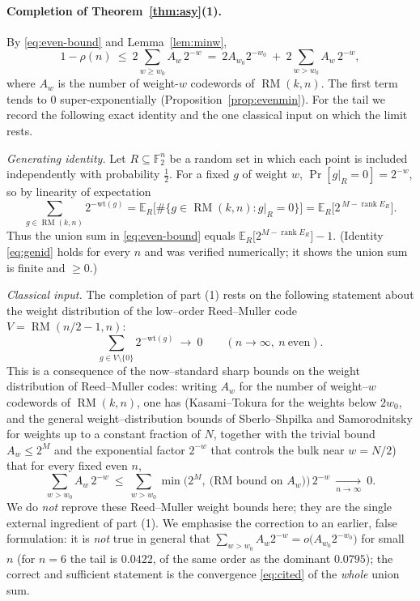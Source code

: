 \documentclass{amsart}
\theoremstyle{definition}
\DeclareMathOperator{\RM}{RM}
\DeclareMathOperator{\rank}{rank}
\newcommand{\F}{\mathbb{F}}
\begin{document}
\paragraph{Completion of Theorem~\ref{thm:asy}(1).}
By \eqref{eq:even-bound} and Lemma~\ref{lem:minw},
\begin{equation}\label{eq:tailsplit}
1-\rho(n)\ \le\ 2\sum_{w\ge w_0}A_w\,2^{-w}
\ =\ 2A_{w_0}2^{-w_0}\ +\ 2\sum_{w>w_0}A_w\,2^{-w},
\end{equation}
where $A_w$ is the number of weight-$w$ codewords of $\RM(k,n)$. The first
term tends to $0$ super-exponentially (Proposition~\ref{prop:evenmin}). For
the tail we record the following exact identity and the one classical input
on which the limit rests.

\emph{Generating identity.} Let $R\subseteq\F_2^n$ be a random set in which
each point is included independently with probability $\tfrac12$. For a
fixed $g$ of weight $w$, $\Pr[g|_R=0]=2^{-w}$, so by linearity of
expectation
\begin{equation}\label{eq:genid}
\sum_{g\in\RM(k,n)}2^{-\mathrm{wt}(g)}
=\mathbb E_R\bigl[\#\{g\in\RM(k,n):g|_R=0\}\bigr]
=\mathbb E_R\bigl[2^{\,M-\rank E_R}\bigr].
\end{equation}
Thus the union sum in \eqref{eq:even-bound} equals
$\mathbb E_R\bigl[2^{M-\rank E_R}\bigr]-1$. (Identity \eqref{eq:genid}
holds for every $n$ and was verified numerically; it shows the union sum
is finite and $\ge0$.)

\emph{Classical input.} The completion of part (1) rests on the following
statement about the weight distribution of the low--order Reed--Muller code
$V=\RM(n/2-1,n)$:
\begin{equation}\label{eq:cited}
\sum_{g\in V\setminus\{0\}}2^{-\mathrm{wt}(g)}\ \longrightarrow\ 0
\qquad(n\to\infty,\ n\ \text{even}).
\end{equation}
This is a consequence of the now--standard sharp bounds on the weight
distribution of Reed--Muller codes: writing $A_w$ for the number of
weight--$w$ codewords of $\RM(k,n)$, one has (Kasami--Tokura for the
weights below $2w_0$, and the general weight--distribution bounds of
Sberlo--Shpilka and Samorodnitsky for weights up to a constant fraction of
$N$, together with the trivial bound $A_w\le 2^M$ and the
exponential factor $2^{-w}$ that controls the bulk near $w=N/2$) that for
every fixed even $n$,
\[
\sum_{w>w_0}A_w\,2^{-w}
\ \le\ \sum_{w>w_0}\min\!\bigl(2^M,\ \text{(RM bound on $A_w$)}\bigr)\,2^{-w}
\ \xrightarrow[n\to\infty]{}\ 0 .
\]
We do \emph{not} reprove these Reed--Muller weight bounds here; they are
the single external ingredient of part (1). We emphasise the correction to
an earlier, false formulation: it is \emph{not} true in general that
$\sum_{w>w_0}A_w2^{-w}=o\bigl(A_{w_0}2^{-w_0}\bigr)$ for small $n$ (for
$n=6$ the tail is $0.0422$, of the same order as the dominant
$0.0795$); the correct and sufficient statement is the convergence
\eqref{eq:cited} of the \emph{whole} union sum.
\end{document}
